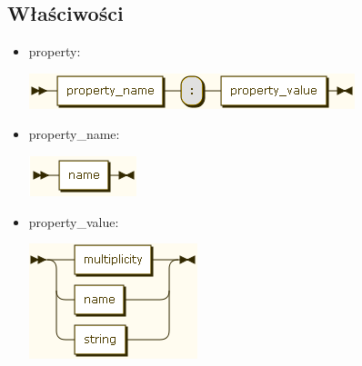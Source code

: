 \documentclass[a4paper,11pt,notitlepage]{article}
\begin{document}
\subsection{Właściwości}
\begin{itemize}
\item property:

\includegraphics[scale=0.66]{images/grammar/property.png}

\item property\_name:

\includegraphics[scale=0.66]{images/grammar/name_xx.png}

\item property\_value:

\includegraphics[scale=0.66]{images/grammar/property_value.png}
\end{itemize}
\end{document}
